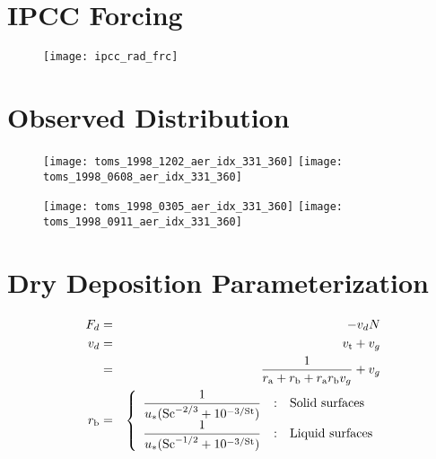 \documentclass[12pt]{article}
\begin{document}
\section[IPCC Forcing]{IPCC Forcing}
\begin{figure*}
\begin{center}
\texttt{[image: ipcc\_rad\_frc]}\vfill
\end{center}
\end{figure*}
\vfill

\section[Observed Distribution]{Observed Distribution}
\begin{figure*}
\begin{center}
\texttt{[image: toms\_1998\_1202\_aer\_idx\_331\_360]}%
\texttt{[image: toms\_1998\_0608\_aer\_idx\_331\_360]}%

\texttt{[image: toms\_1998\_0305\_aer\_idx\_331\_360]}%
\texttt{[image: toms\_1998\_0911\_aer\_idx\_331\_360]}%
\end{center}
\end{figure*}
\vfill

\section{Dry Deposition Parameterization}
\pagedissolve{} %
\begin{eqnarray}
\flxdps & = & - \vlcdps \cnc \\ %
\label{eqn:flx_dps_dfn}
\vlcdps & = & \vlctrb + \vlcgrv \nonumber \\
\label{eqn:vlc_dps_dfn}
& = & \frac{1}{\rssaer + \rsslmn + \rssaer \rsslmn \vlcgrv } + \vlcgrv \\
\label{eqn:rss_dps_dfn}
\rsslmn & = & \left\{
\begin{array}{ >{\displaystyle}l<{} @{\quad:\quad}l}
\frac{1}{\wndfrc ( \shmnbr^{-2/3} + 10^{-3/\stknbr} ) } & \mbox{Solid surfaces} \\
\frac{1}{\wndfrc ( \shmnbr^{-1/2} + 10^{-3/\stknbr} ) } & \mbox{Liquid surfaces}
\end{array} \right.
\label{eqn:rss_lmn_dfn}
\end{eqnarray}
\vfill
\end{document}

